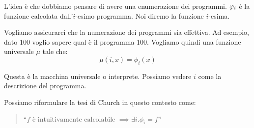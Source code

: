L'idea è che dobbiamo pensare di avere una enumerazione dei programmi. $\varphi_{i}$ è la funzione
calcolata dall'$i$-esimo programma. Noi diremo la funzione $i$-esima.

Vogliamo assicurarci che la numerazione dei programmi sia effettiva. Ad esempio, dato 100 voglio
sapere qual è il programma 100. Vogliamo quindi una funzione universale $\mu$ tale che:
\begin{equation*}
    \mu(i,x) = \phi_{i}(x)
\end{equation*}

Questa è la macchina universale o interprete. Possiamo vedere $i$ come la descrizione del programma.

Possiamo riformulare la tesi di Church in questo contesto come:
\begin{quote}
    ``$f \text{ è intuitivamente calcolabile } \implies \exists i. \phi_{i} = f$''
\end{quote}

